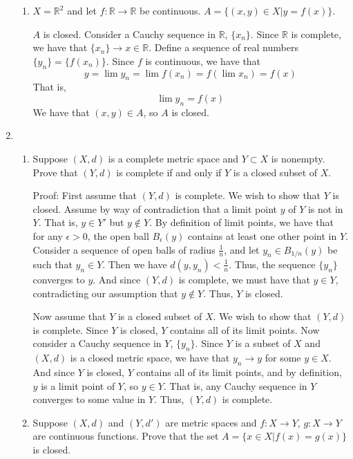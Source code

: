 \documentclass{article}
\begin{document}
\begin{enumerate}
\begin{enumerate}
        \item $X = \mathbb{R}^2$ and let $f: \mathbb{R} \to \mathbb{R}$ be continuous. $A = \{(x,y) \in X | y = f(x)\}$.
        
        $A$ is closed. Consider a Cauchy sequence in $\mathbb{R}$, $\{x_n\}$. Since $\mathbb{R}$ is complete, we have that $\{x_n\} \to x \in \mathbb{R}$. Define a sequence of real numbers $\{y_n\} = \{f(x_n)\}$. Since $f$ is continuous, we have that 
        \[y = \lim y_n = \lim f(x_n)  = f(\lim x_n) = f(x)\]
        That is,
        \[\lim y_n = f(x)\]
        We have that $(x,y) \in A$, so $A$ is closed.
    \end{enumerate}
    
    \item 
    \begin{enumerate} 
    \item Suppose $(X,d)$ is a complete metric space and $Y \subset X$ is nonempty. Prove that $(Y,d)$ is complete if and only if $Y$ is a closed subset of $X$.
    
    Proof: First assume that $(Y,d)$ is complete. We wish to show that $Y$ is closed. Assume by way of contradiction that a limit point $y$ of $Y$ is not in $Y$. That is, $y \in Y'$ but $y \notin Y$. By definition of limit points, we have that for any $\epsilon > 0$, the open ball $B_{\epsilon}(y)$ contains at least one other point in $Y$. Consider a sequence of open balls of radius $\frac{1}{n}$, and let $y_n \in B_{1/n}(y)$ be such that $y_n \in Y$. Then we have $d(y,y_n) < \frac{1}{n}$. Thus, the sequence $\{y_n\}$ converges to $y$. And since $(Y,d)$ is complete, we must have that $y \in Y$, contradicting our assumption that $y \notin Y$. Thus, $Y$ is closed.
    
    Now assume that $Y$ is a closed subset of $X$. We wish to show that $(Y,d)$ is complete. Since $Y$ is closed, $Y$ contains all of its limit points. Now consider a Cauchy sequence in $Y$, $\{y_n\}$. Since $Y$ is a subset of $X$ and $(X,d)$ is a closed metric space, we have that $y_n \to y$ for some $y \in X$. And since $Y$ is closed, $Y$ contains all of its limit points, and by definition, $y$ is a limit point of $Y$, so $y \in Y$. That is, any Cauchy sequence in $Y$ converges to some value in $Y$. Thus, $(Y,d)$ is complete.
    
    \item Suppose $(X,d)$ and $(Y,d')$ are metric spaces and $f: X \to Y$, $g: X \to Y$ are continuous functions. Prove that the set $A = \{x \in X | f(x) = g(x)\}$ is closed.
    

\end{enumerate}
\end{enumerate}
\end{document}
